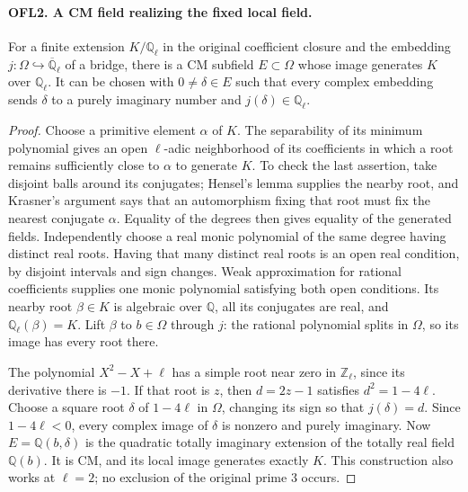 \documentclass[11pt,a4paper]{article}
\numberwithin{equation}{section}
\theoremstyle{remark}\newtheorem{remark}[theorem]{Remark}
\begin{document}
\paragraph{OFL2. A CM field realizing the fixed local field.}
\label{claim:OFL2}
For a finite extension \(K/\mathbb Q_\ell\) in the original
coefficient closure and the embedding \(j:\Omega\hookrightarrow
\overline{\mathbb Q}_\ell\) of a bridge, there is a CM subfield
\(E\subset\Omega\) whose image generates \(K\) over
\(\mathbb Q_\ell\).  It can be chosen with
\(0\ne\delta\in E\) such that every complex embedding sends
\(\delta\) to a purely imaginary number and \(j(\delta)\in
\mathbb Q_\ell\).
\begin{proof}
Choose a primitive element \(\alpha\) of \(K\).  The separability
of its minimum polynomial gives an open \(\ell\)-adic neighborhood
of its coefficients in which a root remains sufficiently close to
\(\alpha\) to generate \(K\).  To check the last assertion,
take disjoint balls around its conjugates; Hensel's lemma supplies
the nearby root, and Krasner's argument says that an automorphism
fixing that root must fix the nearest conjugate \(\alpha\).
Equality of the degrees then gives equality of the generated fields.
Independently choose a real monic polynomial of the same degree
having distinct real roots.  Having that many distinct real roots is
an open real condition, by disjoint intervals and sign changes.
Weak approximation for rational coefficients supplies one monic
polynomial satisfying both open conditions.  Its nearby root
\(\beta\in K\) is algebraic over \(\mathbb Q\), all its
conjugates are real, and \(\mathbb Q_\ell(\beta)=K\).
Lift \(\beta\) to \(b\in\Omega\) through \(j\): the
rational polynomial splits in \(\Omega\), so its image has every
root there.

The polynomial \(X^2-X+\ell\) has a simple root near zero in
\(\mathbb Z_\ell\), since its derivative there is \(-1\).
If that root is \(z\), then \(d=2z-1\) satisfies
\(d^2=1-4\ell\).  Choose a square root \(\delta\) of
\(1-4\ell\) in \(\Omega\), changing its sign so that
\(j(\delta)=d\).  Since \(1-4\ell<0\), every complex image
of \(\delta\) is nonzero and purely imaginary.
Now \(E=\mathbb Q(b,\delta)\) is the quadratic totally imaginary
extension of the totally real field \(\mathbb Q(b)\).  It is CM,
and its local image generates exactly \(K\).  This construction
also works at \(\ell=2\); no exclusion of the original prime
\(3\) occurs.
\end{proof}

\end{document}
